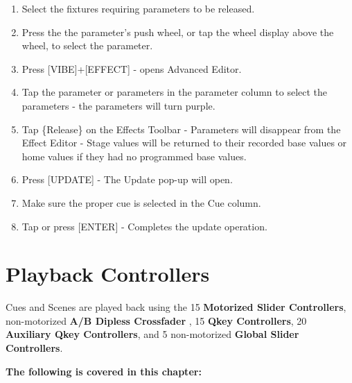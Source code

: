 \documentclass[
]{article}
\begin{document}
\begin{enumerate}
\def\labelenumi{\arabic{enumi}.}
\item
  Select the fixtures requiring parameters to be released.
\item
  Press the the parameter's push wheel, or tap the wheel display above the wheel, to select the parameter.
\item
  Press {[}VIBE{]}+{[}EFFECT{]} - opens Advanced Editor.
\item
  Tap the parameter or parameters in the parameter column to select the parameters - the parameters will turn purple.
\item
  Tap \{Release\} on the Effects Toolbar - Parameters will disappear from the Effect Editor - Stage values will be returned to their recorded base values or home values if they had no programmed base values.
\item
  Press {[}UPDATE{]} - The Update pop-up will open.
\item
  Make sure the proper cue is selected in the Cue column.
\item
  Tap or press {[}ENTER{]} - Completes the update operation.
\end{enumerate}

\hypertarget{playback-controllers}{%
\section{Playback Controllers}\label{playback-controllers}}

Cues and Scenes are played back using the 15 \textbf{Motorized Slider Controllers}, non-motorized \textbf{A/B Dipless Crossfader} , 15 \textbf{Qkey Controllers}, 20 \textbf{Auxiliary Qkey Controllers}, and 5 non-motorized \textbf{Global Slider Controllers}.

\textbf{The following is covered in this chapter:}
\end{document}
